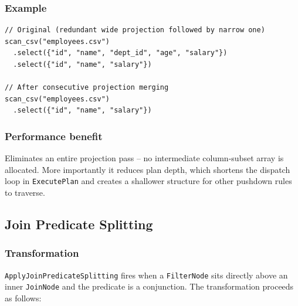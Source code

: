 \documentclass[12pt,a4paper]{article}
\begin{document}
\subsubsection*{Example}

\begin{lstlisting}
// Original (redundant wide projection followed by narrow one)
scan_csv("employees.csv")
  .select({"id", "name", "dept_id", "age", "salary"})
  .select({"id", "name", "salary"})

// After consecutive projection merging
scan_csv("employees.csv")
  .select({"id", "name", "salary"})
\end{lstlisting}

\subsubsection*{Performance benefit}

Eliminates an entire projection pass -- no intermediate column-subset array
is allocated.  More importantly it reduces plan depth, which shortens the
dispatch loop in \texttt{ExecutePlan} and creates a shallower structure for
other pushdown rules to traverse.

\subsection{Join Predicate Splitting}

\subsubsection*{Transformation}

\texttt{ApplyJoinPredicateSplitting} fires when a \texttt{FilterNode} sits
directly above an inner \texttt{JoinNode} and the predicate is a
conjunction.  The transformation proceeds as follows:
\end{document}
